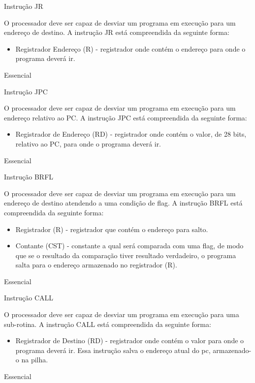 \documentclass{article}
\begin{document}
    \begin{functional}
      \requirement
      {Instrução JR}
      {O processador deve ser capaz de desviar um programa em execução para um endereço de destino.
      A instrução JR está compreendida da seguinte forma:\\
       \begin{itemize}
         \item Registrador Endereço (R) - registrador onde contém o endereço para onde o programa deverá ir.
         \end{itemize}
         }
      {Essencial}

      \requirement
      {Instrução JPC}
      {O processador deve ser capaz de desviar um programa em execução para um endereço relativo ao PC.
      A instrução JPC está compreendida da seguinte forma:\\
       \begin{itemize}
         \item Registrador de Endereço (RD) - registrador onde contém o valor, de 28 bits, relativo ao PC, para onde o programa deverá ir.
         \end{itemize}
         }
      {Essencial}

      \requirement
      {Instrução BRFL}
      {O processador deve ser capaz de desviar um programa em execução para um endereço de destino atendendo a uma condição de flag.
      A instrução BRFL está compreendida da seguinte forma:\\
       \begin{itemize}
         \item Registrador (R) - registrador que contém o endereço para salto.
         \item Contante (CST) - constante a qual será comparada com uma flag, de modo que se o resultado da comparação tiver resultado verdadeiro, o programa salta para o endereço armazenado no registrador (R).
         \end{itemize}
         }
      {Essencial}

      \requirement
      {Instrução CALL}
      {O processador deve ser capaz de desviar um programa em execução para uma sub-rotina.
      A instrução CALL está compreendida da seguinte forma:\\
       \begin{itemize}
         \item Registrador de Destino (RD) - registrador onde contém o valor para onde o programa deverá ir. Essa instrução salva o endereço atual do pc, armazenado-o na pilha.
        \end{itemize}
        }
      {Essencial}


\end{functional}
\end{document}

